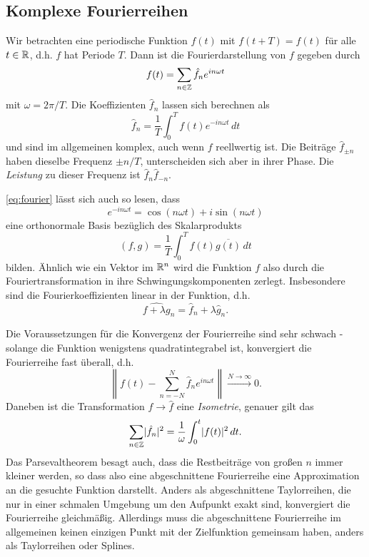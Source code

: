\subsection{Komplexe Fourierreihen}
Wir betrachten eine periodische Funktion $f(t)$ mit $f(t+T) = f(t)$
für alle $t\in\mathbb{R}$, d.h. $f$ hat Periode $T$. Dann ist die
Fourierdarstellung von $f$ gegeben durch
\begin{equation}
  \label{eq:fourier}
  f(t) = \sum_{n\in\mathbb{Z}} \hat{f}_n e^{i n\omega t}
\end{equation}
mit $\omega=2\pi/T$. Die Koeffizienten $\hat{f}_n$ lassen sich
berechnen als
\begin{equation*}
  \label{eq:fouriercoeff}
  \hat{f}_n = \frac{1}{T}\int_0^T f(t)e^{-i n\omega t}\, dt
\end{equation*}
und sind im allgemeinen komplex, auch wenn $f$ reellwertig ist. Die
Beiträge $\hat{f}_{\pm n}$ haben dieselbe Frequenz $\pm n/T$,
unterscheiden sich aber in ihrer Phase. Die \emph{Leistung} zu dieser
Frequenz ist $\hat{f}_{n}\hat{f}_{-n}$.

\eqref{eq:fourier} lässt sich auch so lesen, dass
\begin{equation}
  e^{-i n\omega t} = \cos(n \omega t) + i \sin(n \omega t)
\end{equation}
eine orthonormale Basis bezüglich des Skalarprodukts
\begin{equation}
  \label{eq:l2scalar}
  (f, g) = \frac{1}{T}\int_0^T f(t)\overline{g(t)}\,dt
\end{equation}
bilden. Ähnlich wie ein Vektor im $\mathbb{R}^n$ wird die Funktion $f$ also
durch die Fouriertransformation in ihre Schwingungskomponenten
zerlegt.  Insbesondere sind die Fourierkoeffizienten linear in der
Funktion, d.h.
\begin{equation}
  \widehat{f+\lambda g}_n = \hat{f}_n +\lambda \hat{g}_n.
\end{equation}

Die Voraussetzungen für die Konvergenz der Fourierreihe sind sehr
schwach - solange die Funktion wenigstens quadratintegrabel ist,
konvergiert die Fourierreihe fast überall, d.h.
\begin{equation}
  \left\lVert f(t) - \sum_{n=-N}^N \hat{f}_n e^{i n\omega t} \right\rVert \xrightarrow{N\to\infty} 0.
\end{equation}
Daneben ist die Transformation $f\to\hat{f}$ eine \emph{Isometrie},
genauer gilt das \emph{}
\begin{equation}
  \sum_{n\in\mathbb{Z}} \lvert\hat{f}_n\rvert^2 =
  \frac{1}{\omega}\int_0^t \lvert f(t)\rvert^2\,dt.
\end{equation}
Das Parsevaltheorem besagt auch, dass die Restbeiträge von großen $n$
immer kleiner werden, so dass also eine abgeschnittene Fourierreihe
eine Approximation an die gesuchte Funktion darstellt. Anders als
abgeschnittene Taylorreihen, die nur in einer schmalen Umgebung um den
Aufpunkt exakt sind, konvergiert die Fourierreihe
gleichmäßig. Allerdings muss die abgeschnittene Fourierreihe im
allgemeinen keinen einzigen Punkt mit der Zielfunktion gemeinsam
haben, anders als Taylorreihen oder Splines.

